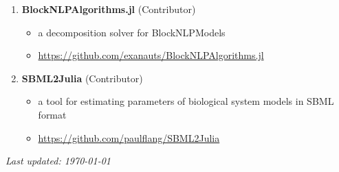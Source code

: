 \documentclass[letterpaper, 11pt]{article}
\begin{document}
\begin{enumerate}[itemsep=0pt]
\item {\bf BlockNLPAlgorithms.jl} (Contributor)
  \begin{itemize}[leftmargin=*,topsep=0pt,label=$\bullet$,topsep=-5pt,itemsep=-1pt]
  \item a decomposition solver for BlockNLPModels
  \item \url{https://github.com/exanauts/BlockNLPAlgorithms.jl}
  \end{itemize}
\item {\bf SBML2Julia} (Contributor)
  \begin{itemize}[leftmargin=*,topsep=0pt,label=$\bullet$,topsep=-5pt,itemsep=-1pt]
  \item a tool for estimating parameters of biological system models in SBML format
  \item \url{https://github.com/paulflang/SBML2Julia}
  \end{itemize}
\end{enumerate}


{\noindent\it Last updated: \today}
\end{document}
